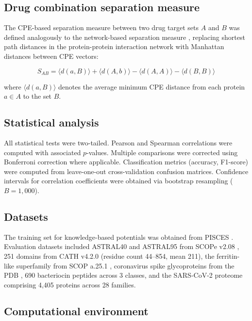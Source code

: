 \documentclass[11pt]{article}
\begin{document}
\subsection{Drug combination separation measure}

The CPE-based separation measure between two drug target sets $A$ and $B$ was defined analogously to the network-based separation measure \citep{cheng2019}, replacing shortest path distances in the protein-protein interaction network with Manhattan distances between CPE vectors:

\begin{equation}
S_{AB} = \langle d(a,B) \rangle + \langle d(A,b) \rangle - \langle d(A,A) \rangle - \langle d(B,B) \rangle
\end{equation}

\noindent where $\langle d(a,B) \rangle$ denotes the average minimum CPE distance from each protein $a \in A$ to the set $B$.

\subsection{Statistical analysis}

All statistical tests were two-tailed. Pearson and Spearman correlations were computed with associated $p$-values. Multiple comparisons were corrected using Bonferroni correction where applicable. Classification metrics (accuracy, F1-score) were computed from leave-one-out cross-validation confusion matrices. Confidence intervals for correlation coefficients were obtained via bootstrap resampling ($B = 1{,}000$).

\subsection{Datasets}

The training set for knowledge-based potentials was obtained from PISCES \citep{wang2004}. Evaluation datasets included ASTRAL40 and ASTRAL95 from SCOPe v2.08 \citep{fox2014}, 251 domains from CATH v4.2.0 \citep{sillitoe2019} (residue count 44--854, mean 211), the ferritin-like superfamily from SCOP a.25.1 \citep{malik2019, lelievre2020}, coronavirus spike glycoproteins from the PDB \citep{wrapp2020}, 690 bacteriocin peptides across 3 classes, and the SARS-CoV-2 proteome comprising 4{,}405 proteins across 28 families.

\subsection{Computational environment}
\end{document}
